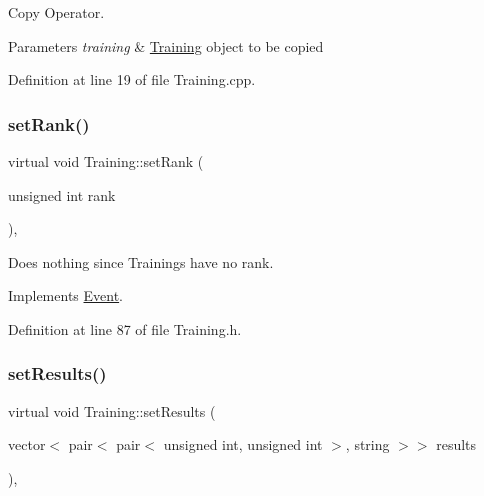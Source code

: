 Copy Operator. 


\begin{DoxyParams}{Parameters}
{\em training} & \hyperlink{class_training}{Training} object to be copied \\
\hline
\end{DoxyParams}


Definition at line 19 of file Training.\+cpp.

\hypertarget{class_training_a15d38322bd6a2ee8e17441bd4798b236}{}\label{class_training_a15d38322bd6a2ee8e17441bd4798b236} 
\subsubsection{\texorpdfstring{set\+Rank()}{setRank()}}
{\footnotesize\ttfamily virtual void Training\+::set\+Rank (\begin{DoxyParamCaption}\item[{unsigned int}]{rank }\end{DoxyParamCaption})\hspace{0.3cm}{\ttfamily [inline]}, {\ttfamily [virtual]}}



Does nothing since Trainings have no rank. 



Implements \hyperlink{class_event_a5bccaba301e9038957ec4138df404524}{Event}.



Definition at line 87 of file Training.\+h.

\hypertarget{class_training_ad587b59c44a6e95a4e52f3d3f6b89480}{}\label{class_training_ad587b59c44a6e95a4e52f3d3f6b89480} 
\subsubsection{\texorpdfstring{set\+Results()}{setResults()}}
{\footnotesize\ttfamily virtual void Training\+::set\+Results (\begin{DoxyParamCaption}\item[{vector$<$ pair$<$ pair$<$ unsigned int, unsigned int $>$, string $>$$>$}]{results }\end{DoxyParamCaption})\hspace{0.3cm}{\ttfamily [inline]}, {\ttfamily [virtual]}}



